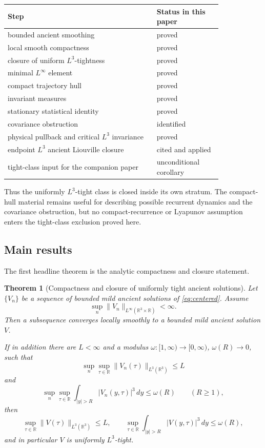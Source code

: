 \documentclass[11pt]{amsart}
\theoremstyle{plain}
\newtheorem{theorem}{Theorem}[section]
\theoremstyle{definition}
\theoremstyle{remark}
\numberwithin{equation}{section}
\newcommand{\R}{\mathbb R}
\begin{document}
\begin{center}
\small
\begin{tabular}{p{0.58\linewidth}p{0.25\linewidth}}
\hline
Step & Status in this paper\\
\hline
bounded ancient smoothing & proved\\
local smooth compactness & proved\\
closure of uniform \(L^3\)-tightness & proved\\
minimal \(L^\infty\) element & proved\\
compact trajectory hull & proved\\
invariant measures & proved\\
stationary statistical identity & proved\\
covariance obstruction & identified\\
physical pullback and critical \(L^3\) invariance & proved\\
endpoint \(L^3\) ancient Liouville closure & cited and applied\\
tight-class input for the companion paper & unconditional corollary\\
\hline
\end{tabular}
\end{center}

Thus the uniformly \(L^3\)-tight class is closed inside its own stratum.  The
compact-hull material remains useful for describing possible recurrent
dynamics and the covariance obstruction, but no compact-recurrence or
Lyapunov assumption enters the tight-class exclusion proved here.

\subsection{Main results}

The first headline theorem is the analytic compactness and closure statement.

\begin{theorem}[Compactness and closure of uniformly tight ancient solutions]
\label{thm:tight-compactness-intro}
Let \(\{V_n\}\) be a sequence of bounded mild ancient solutions of
\eqref{eq:centered}.  Assume
\[
   \sup_n\|V_n\|_{L^\infty(\R^3\times\R)}<\infty .
\]
Then a subsequence converges locally smoothly to a bounded mild ancient
solution \(V\).

If in addition there are \(L<\infty\) and a modulus
\(\omega:[1,\infty)\to[0,\infty)\), \(\omega(R)\to0\), such that
\[
   \sup_n\sup_{\tau\in\R}\|V_n(\tau)\|_{L^3(\R^3)}\le L
\]
and
\[
   \sup_n\sup_{\tau\in\R}
   \int_{|y|>R}|V_n(y,\tau)|^3\,dy\le \omega(R)
   \qquad (R\ge1),
\]
then
\[
   \sup_{\tau\in\R}\|V(\tau)\|_{L^3(\R^3)}\le L,
   \qquad
   \sup_{\tau\in\R}\int_{|y|>R}|V(y,\tau)|^3\,dy\le\omega(R),
\]
and in particular \(V\) is uniformly \(L^3\)-tight.
\end{theorem}
\end{document}
